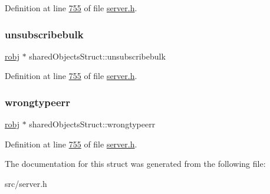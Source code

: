 Definition at line \hyperlink{server_8h_source_l00755}{755} of file \hyperlink{server_8h_source}{server.\+h}.

\mbox{\label{structsharedObjectsStruct_a6da24900d2c85401a1178a8a88064583}} 
\subsubsection{\texorpdfstring{unsubscribebulk}{unsubscribebulk}}
{\footnotesize\ttfamily \hyperlink{structredisObject}{robj} $\ast$ shared\+Objects\+Struct\+::unsubscribebulk}



Definition at line \hyperlink{server_8h_source_l00755}{755} of file \hyperlink{server_8h_source}{server.\+h}.

\mbox{\label{structsharedObjectsStruct_a8e7aecc56502e1b03bc2b5f7b6ccbaf2}} 
\subsubsection{\texorpdfstring{wrongtypeerr}{wrongtypeerr}}
{\footnotesize\ttfamily \hyperlink{structredisObject}{robj} $\ast$ shared\+Objects\+Struct\+::wrongtypeerr}



Definition at line \hyperlink{server_8h_source_l00755}{755} of file \hyperlink{server_8h_source}{server.\+h}.



The documentation for this struct was generated from the following file\+:\begin{DoxyCompactItemize}
\item 
src/server.\+h\end{DoxyCompactItemize}
